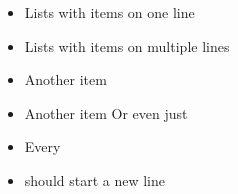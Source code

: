 \documentclass{article}
\begin{document}
\begin{itemize}

\item Lists with items on one line

\item Lists with items
on multiple lines

\item Another item

\item Another item
Or even just %

\item Every \item should start a new line

\end{itemize}
\end{document}

